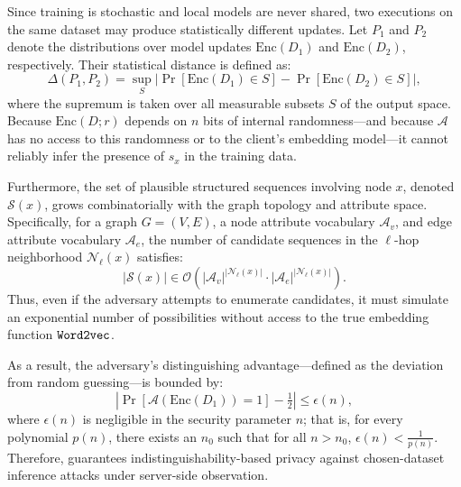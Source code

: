 Since training is stochastic and local models are never shared, two executions on the same dataset may produce statistically different updates. Let \(P_1\) and \(P_2\) denote the distributions over model updates \(\text{Enc}(D_1)\) and \(\text{Enc}(D_2)\), respectively. Their statistical distance is defined as:
\[
\Delta(P_1, P_2) = \sup_{S} \left| \Pr[\text{Enc}(D_1) \in S] - \Pr[\text{Enc}(D_2) \in S] \right|,
\]
where the supremum is taken over all measurable subsets \(S\) of the output space. Because \(\text{Enc}(D; r)\) depends on \(n\) bits of internal randomness—and because \(\mathcal{A}\) has no access to this randomness or to the client’s embedding model—it cannot reliably infer the presence of \(s_x\) in the training data.

Furthermore, the set of plausible structured sequences involving node \(x\), denoted \(\mathcal{S}(x)\), grows combinatorially with the graph topology and attribute space. Specifically, for a graph \(G = (V, E)\), a node attribute vocabulary \(\mathcal{A}_v\), and edge attribute vocabulary \(\mathcal{A}_e\), the number of candidate sequences in the \(\ell\)-hop neighborhood \(\mathcal{N}_\ell(x)\) satisfies:
\[
|\mathcal{S}(x)| \in \mathcal{O}\left(|\mathcal{A}_v|^{|\mathcal{N}_\ell(x)|} \cdot |\mathcal{A}_e|^{|\mathcal{N}_\ell(x)|}\right).
\]
Thus, even if the adversary attempts to enumerate candidates, it must simulate an exponential number of possibilities without access to the true embedding function \(\texttt{Word2vec}\).

As a result, the adversary’s distinguishing advantage—defined as the deviation from random guessing—is bounded by:
\[
\left| \Pr[\mathcal{A}(\text{Enc}(D_1)) = 1] - \tfrac{1}{2} \right| \leq \epsilon(n),
\]
where \(\epsilon(n)\) is negligible in the security parameter \(n\); that is, for every polynomial \(p(n)\), there exists an \(n_0\) such that for all \(n > n_0\), \(\epsilon(n) < \frac{1}{p(n)}\). Therefore, \Sys guarantees indistinguishability-based privacy against chosen-dataset inference attacks under server-side observation.


